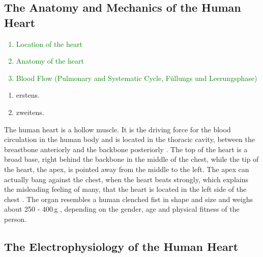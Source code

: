 \subsection{The Anatomy and Mechanics of the Human Heart}
\textcolor{green}{     
	\begin{enumerate}
         		\item Location of the heart
         		\item Anatomy of the heart
         		\item Blood Flow (Pulmonary and Systematic Cycle, Füllungs und Leerungsphase)
     	 \end{enumerate}
}
\label{anatomy}
      \begin{enumerate}
         \item erstens.
         \item zweitens.
      \end{enumerate}
The human heart is a hollow muscle. It is the driving force for the blood circulation in the human body and is located in the thoracic cavity, between the breastbone anteriorly and the backbone posteriorly \cite{sherwood07}. The top of the heart is a broad base, right behind the backbone in the middle of the chest, while the tip of the heart, the apex, is pointed away from the middle to the left. The apex can actually bang against the chest, when the heart beats strongly, which explains the misleading feeling of many, that the heart is located in the left side of the chest \cite{sherwood07}. The organ resembles a human clenched fist in shape and size and weighs about 250 - 400\,g \cite{schwegler11}, depending on the gender, age and physical fitness of the person. 



\subsection{The Electrophysiology of the Human Heart}
\label{physiology}



